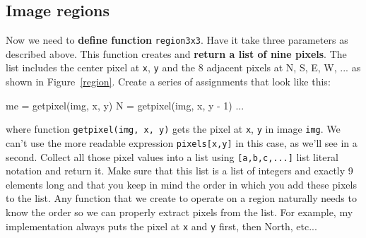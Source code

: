 \documentclass[titlepage]{tufte-book}
\newcommand{\figref}[1]{Figure~\ref{#1}}
\begin{document}
\subsection{Image regions}

Now we need to {\bf define function} {\tt region3x3}.  Have it take three parameters as described above. This function creates and {\bf return a list of nine pixels}. The list includes the center pixel at {\tt x}, {\tt y} and the 8 adjacent pixels at N, S, E, W, ... as shown in \figref{region}. Create a series of assignments that look like this:

\begin{marginfigure}
\begin{center}
\end{center}
\label{region}
\end{marginfigure}

\begin{pyverbatim}
me = getpixel(img, x, y)
N = getpixel(img, x, y - 1)
...
\end{pyverbatim}

\noindent where function {\tt getpixel(img, x, y)} gets the pixel at {\tt x}, {\tt y} in image {\tt img}.  We can't use the more readable expression {\tt pixels[x,y]} in this case, as we'll see in a second. Collect all those pixel values into a list using {\tt [a,b,c,...]} list literal notation and return it. Make sure that this list is a list of integers and exactly 9 elements long and that you keep in mind the order in which you add these pixels to the list. Any function that we create to operate on a region naturally needs to know the order so we can properly extract pixels from the list. For example, my implementation always puts the pixel at {\tt x} and {\tt y} first, then North, etc...
\end{document}
